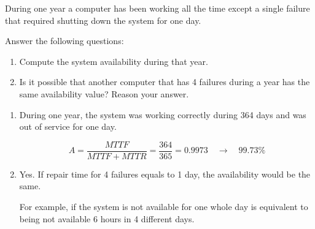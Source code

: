 \begin{acexercise}\end{acexercise}

During one year a computer has been working all the time except a single
failure that required shutting down the system for one day.

Answer the following questions:

\begin{enumerate}

  \item Compute the system availability during that year.

  \item Is it possible that another computer that has 4 failures during a year
has the same availability value? Reason your answer.

\end{enumerate}

\begin{acsolution}\end{acsolution}

\begin{enumerate}

\item

During one year, the system was working correctly during 364 days and was out of service
for one day.

\[
A = \frac{MTTF}{MTTF + MTTR} = \frac{364}{365} = 0.9973 \quad
\rightarrow \quad 99.73\%
\]

\item

Yes. If repair time for 4 failures equals to 1 day, the availability would be the same. 

For example, if the system is not available for one whole day is equivalent
to being not available 6 hours in 4 different days.

\end{enumerate}
